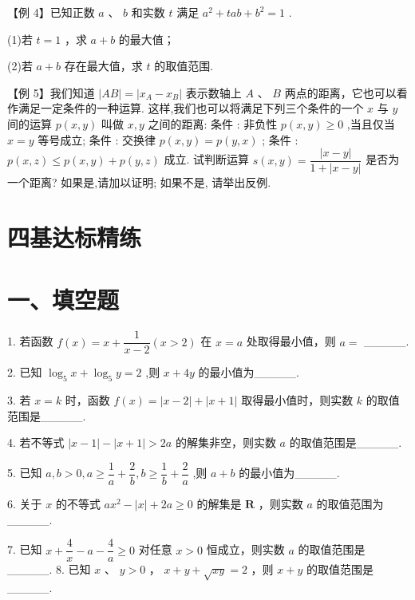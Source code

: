 【例 4】已知正数 $a$ 、 $b$ 和实数 $t$ 满足 ${a}^{2} + {tab} + {b}^{2} = 1$ .

(1)若 $t = 1$ ，求 $a + b$ 的最大值；

(2)若 $a + b$ 存在最大值，求 $t$ 的取值范围.

【例 5】我们知道 $\left| {AB}\right|  = \left| {{x}_{A} - {x}_{B}}\right|$ 表示数轴上 $A$ 、 $B$ 两点的距离，它也可以看作满足一定条件的一种运算. 这样,我们也可以将满足下列三个条件的一个 $x$ 与 $y$ 间的运算 $p\left( {x,y}\right)$ 叫做 $x,y$ 之间的距离: 条件  : 非负性 $p\left( {x,y}\right)  \geq  0$ ,当且仅当 $x = y$ 等号成立; 条件  : 交换律 $p\left( {x,y}\right)  = p\left( {y,x}\right)$ ; 条件  : $p\left( {x,z}\right)  \leq  p\left( {x,y}\right)  + p\left( {y,z}\right)$ 成立. 试判断运算 $s\left( {x,y}\right)  = \dfrac{\left| x - y\right| }{1 + \left| {x - y}\right| }$ 是否为一个距离? 如果是,请加以证明; 如果不是, 请举出反例.

\section*{四基达标精练}

\section*{一、填空题}

1. 若函数 $f\left( x\right)  = x + \dfrac{1}{x - 2}\left( {x > 2}\right)$ 在 $x = a$ 处取得最小值，则 $a =$ \_\_\_\_\_.

2. 已知 ${\log }_{5}x + {\log }_{5}y = 2$ ,则 $x + {4y}$ 的最小值为\_\_\_\_\_.

3. 若 $x = k$ 时，函数 $f\left( x\right)  = \left| {x - 2}\right|  + \left| {x + 1}\right|$ 取得最小值时，则实数 $k$ 的取值范围是\_\_\_\_\_.

4. 若不等式 $\left| {x - 1}\right|  - \left| {x + 1}\right|  > {2a}$ 的解集非空，则实数 $a$ 的取值范围是\_\_\_\_\_.

5. 已知 $a,b > 0,a \geq  \dfrac{1}{a} + \dfrac{2}{b},b \geq  \dfrac{1}{b} + \dfrac{2}{a}$ ,则 $a + b$ 的最小值为\_\_\_\_\_.

6. 关于 $x$ 的不等式 $a{x}^{2} - \left| x\right|  + {2a} \geq  0$ 的解集是 $\mathbf{R}$ ，则实数 $a$ 的取值范围为\_\_\_\_\_.

7. 已知 $x + \dfrac{4}{x} - a - \dfrac{4}{a} \geq  0$ 对任意 $x > 0$ 恒成立，则实数 $a$ 的取值范围是\_\_\_\_\_. 8. 已知 $x$ 、 $y > 0$ ， $x + y + \sqrt{xy} = 2$ ，则 $x + y$ 的取值范围是\_\_\_\_\_.

